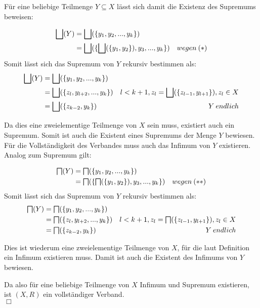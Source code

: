 Für eine beliebige Teilmenge $Y \subseteq X$ lässt sich damit die Existenz des Supremums beweisen:

\begin{align*}
\bigsqcup(Y) &= \bigsqcup(\{y_1, y_2, ... , y_k\}) & \\
& =  \bigsqcup(\{ \bigsqcup(\{y_1, y_2\}), y_3, ... , y_k\}) & wegen  \medspace (*)\\
\end{align*}
Somit lässt sich das Supremum von $Y$ rekursiv bestimmen als:
\begin{align*}
\bigsqcup(Y) &= \bigsqcup(\{y_1, y_2, ... , y_k\}) & \\
& =  \bigsqcup(\{ z_l, y_{l+2}, ... , y_k\}) & l < k+1, z_l = \bigsqcup(\{z_{l-1}, y_{l+1}\}), z_l \in X\\
& =   \bigsqcup(\{ z_{k-2}, y_k\}) & Y  \medspace endlich
\end{align*}

Da dies eine zweielementige Teilmenge von $X$ sein muss,
existiert auch ein Supremum. Somit ist auch die Existent eines Supremums der Menge $Y$ bewiesen.
Für die Vollständigkeit des Verbandes muss auch das Infimum von $Y$ existieren.
Analog zum Supremum gilt:

\begin{align*}
\Inf(Y) &= \Inf(\{y_1, y_2, ... , y_k\}) & \\
& =  \Inf(\{ \Inf(\{y_1, y_2\}), y_3, ... , y_k\}) & wegen  \medspace (**)\\
\end{align*}
Somit lässt sich das Supremum von $Y$ rekursiv bestimmen als:
\begin{align*}
\Inf(Y) &= \Inf(\{y_1, y_2, ... , y_k\}) & \\
& =  \Inf(\{ z_l, y_{l+2}, ... , y_k\}) & l < k+1, z_l = \Inf(\{z_{l-1}, y_{l+1}\}), z_l \in X\\
& =   \Inf(\{ z_{k-2}, y_k\}) & Y  \medspace endlich
\end{align*}

Dies ist wiederum eine zweielementige Teilmenge von $X$,
für die laut Definition ein Infimum existieren muss.
Damit ist auch die Existent des Infimums von $Y$ bewiesen.

Da also für eine beliebige Teilmenge von $X$ Infimum und Supremum existieren, ist $(X,R)$ ein vollständiger Verband.\\
$\Box$

